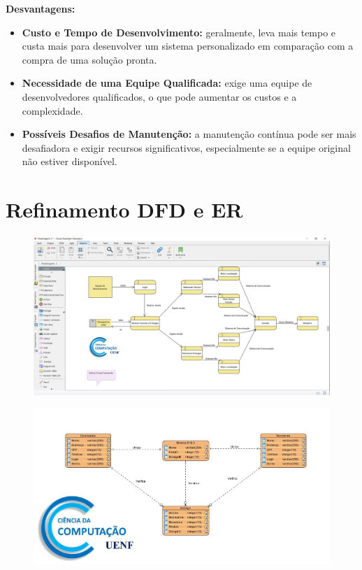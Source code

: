 \textbf{Desvantagens:}
\begin{itemize}
	\item \textbf{Custo e Tempo de Desenvolvimento:} geralmente, leva mais tempo e custa mais para desenvolver um sistema personalizado em comparação com a compra de uma solução pronta.
	
	\item \textbf{Necessidade de uma Equipe Qualificada:} exige uma equipe de desenvolvedores qualificados, o que pode aumentar os custos e a complexidade.
	
	\item \textbf{Possíveis Desafios de Manutenção:} a manutenção contínua pode ser mais desafiadora e exigir recursos significativos, especialmente se a equipe original não estiver disponível.
	
\end{itemize}

\section{Refinamento DFD e ER}

\begin{figure}[H]
	\centering
	\includegraphics[width=1\linewidth]{"Pictures/Fluxo de Dados 3"}
	\caption{}
	\label{fig:fluxo-de-dados-3}
\end{figure}

\begin{figure}[H]
	\centering
	\includegraphics[width=1.2\linewidth]{Pictures/ER3}
	\caption{}
	\label{fig:er3}
\end{figure}

